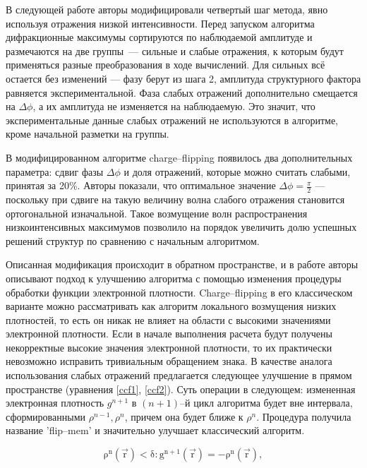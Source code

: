 В следующей работе \cite{oszlanyi_it_2005} авторы модифицировали четвертый шаг метода, явно используя отражения низкой интенсивности. Перед запуском алгоритма дифракционные максимумы сортируются по наблюдаемой амплитуде и размечаются на две группы~--- сильные и слабые отражения, к которым будут применяться разные преобразования в ходе вычислений. Для сильных всё остается без изменений --- фазу берут из шага 2, амплитуда структурного фактора равняется экспериментальной. Фаза слабых отражений дополнительно смещается на $\Delta\phi$, а их амплитуда не изменяется на наблюдаемую. Это значит, что экспериментальные данные слабых отражений не используются в алгоритме, кроме начальной разметки на группы.

В модифицированном алгоритме charge--flipping появилось два дополнительных параметра: сдвиг фазы $\Delta\phi$ и доля отражений, которые можно считать слабыми, принятая за 20\%. Авторы показали, что оптимальное значение $\Delta\phi = \frac{\pi}{2}$ --- поскольку при сдвиге на такую величину волна слабого отражения становится ортогональной изначальной. Такое возмущение волн распространения низкоинтенсивных максимумов позволило на порядок увеличить долю успешных решений структур по сравнению с начальным алгоритмом.

Описанная модификация происходит в обратном пространстве, и в работе \cite{oszlanyi_charge_2008} авторы описывают подход к улучшению алгоритма с помощью изменения процедуры обработки функции электронной плотности. Charge--flipping в его классическом варианте можно рассматривать как алгоритм локального возмущения низких плотностей, то есть он никак не влияет на области с высокими значениями электронной плотности. Если в начале выполнения расчета будут получены некорректные высокие значения электронной плотности, то их практически невозможно исправить тривиальным обращением знака. В качестве аналога использования слабых отражений предлагается следующее улучшение в прямом пространстве (уравнения \ref{ccf1}, \ref{ccf2}).  Суть операции в следующем: измененная электронная плотность $g^{n+1}$ в $(n+1)$--й цикл алгоритма будет вне интервала, сформированными $\rho^{n-1}, \rho^{n}$, причем она будет ближе к $\rho^n$. Процедура получила название 'flip--mem' и значительно улучшает классический алгоритм.


\begin{equation}\label{ccf1}
	\mathrm{\rho^n(\overrightarrow{r}) < \delta: g^{n+1}(\overrightarrow{r}) = -\rho^n(\overrightarrow{r})},
\end{equation}
 
